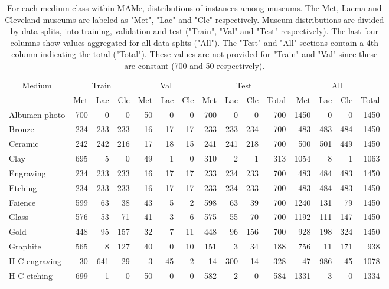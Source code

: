 \documentclass{article}
\begin{document}
\begin{table}[t]
\centering
\caption{For each medium class within MAMe, distributions of instances among museums. The Met, Lacma and Cleveland museums are labeled as "Met", "Lac" and "Cle" respectively. Museum distributions are divided by data splits, into training, validation and test ("Train", "Val" and "Test" respectively). The last four columns show values aggregated for all data splits ("All"). The "Test" and "All" sections contain a 4th column indicating the total ("Total"). These values are not provided for "Train" and "Val" since these are constant (700 and 50 respectively).}
\label{tab:medium_museums}
\begin{tabular}{l|rrr|rrr|rrrr||rrrr}
\multicolumn{1}{c|}{Medium} & \multicolumn{3}{c|}{Train} & \multicolumn{3}{c|}{Val} & \multicolumn{4}{c||}{Test} & \multicolumn{4}{c}{All} \\
                           & Met     & Lac    & Cle    & Met    & Lac    & Cle   & Met  & Lac  & Cle  & Total & Met  & Lac & Cle & Total  \\ \hline
Albumen photo & 700 & 0 & 0 & 50 & 0 & 0 & 700 & 0 & 0 & 700 & 1450 & 0 & 0 & 1450 \\
Bronze & 234 & 233 & 233 & 16 & 17 & 17 & 233 & 233 & 234 & 700 & 483 & 483 & 484 & 1450 \\
Ceramic & 242 & 242 & 216 & 17 & 18 & 15 & 241 & 241 & 218 & 700 & 500 & 501 & 449 & 1450 \\
Clay & 695 & 5 & 0 & 49 & 1 & 0 & 310 & 2 & 1 & 313 & 1054 & 8 & 1 & 1063 \\
Engraving & 234 & 233 & 233 & 16 & 17 & 17 & 233 & 234 & 233 & 700 & 483 & 484 & 483 & 1450 \\
Etching & 234 & 233 & 233 & 16 & 17 & 17 & 233 & 234 & 233 & 700 & 483 & 484 & 483 & 1450 \\
Faience & 599 & 63 & 38 & 43 & 5 & 2 & 598 & 63 & 39 & 700 & 1240 & 131 & 79 & 1450 \\
Glass & 576 & 53 & 71 & 41 & 3 & 6 & 575 & 55 & 70 & 700 & 1192 & 111 & 147 & 1450 \\
Gold & 448 & 95 & 157 & 32 & 7 & 11 & 448 & 96 & 156 & 700 & 928 & 198 & 324 & 1450 \\
Graphite & 565 & 8 & 127 & 40 & 0 & 10 & 151 & 3 & 34 & 188 & 756 & 11 & 171 & 938 \\
H-C engraving & 30 & 641 & 29 & 3 & 45 & 2 & 14 & 300 & 14 & 328 & 47 & 986 & 45 & 1078 \\
H-C etching & 699 & 1 & 0 & 50 & 0 & 0 & 582 & 2 & 0 & 584 & 1331 & 3 & 0 & 1334 \\

\end{tabular}
\end{table}
\end{document}
